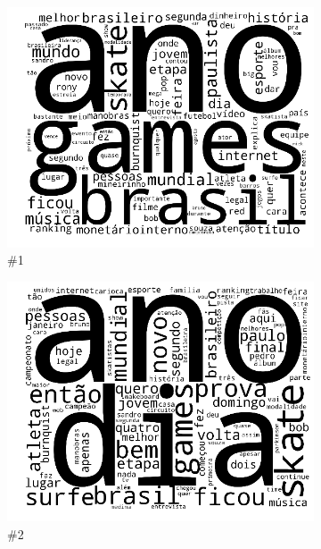 \documentclass[
    12pt,                %
    oneside,            %
    a4paper,            %
    english,            %
    brazil                %
    ]{abntex2ppgsi}
\begin{document}
\begin{figure}[H]
\centering
    \begin{subfigure}[b]{0.15\textwidth}
        \includegraphics[width=\textwidth]{img/ovnmtf-nc-2-tc-1.png}
        \caption{\#1}
    \end{subfigure}
    \begin{subfigure}[b]{0.15\textwidth}
        \includegraphics[width=\textwidth]{img/ovnmtf-nc-2-tc-2.png}
        \caption{\#2}
    \end{subfigure}
    \begin{subfigure}[b]{0.15\textwidth}

\end{subfigure}
\end{figure}
\end{document}
